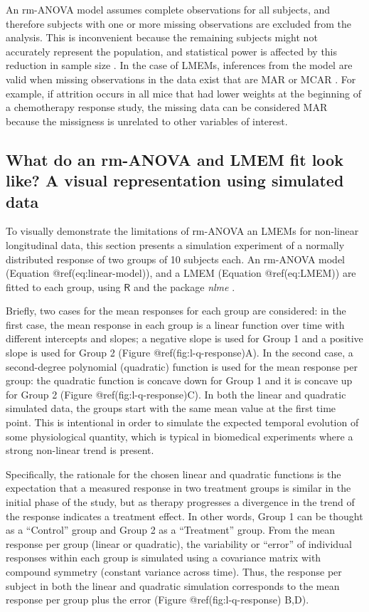 \documentclass[Royal,times,sagev]{sagej}
\begin{document}
An rm-ANOVA model assumes complete observations for all subjects, and
therefore subjects with one or more missing observations are excluded
from the analysis. This is inconvenient because the remaining subjects
might not accurately represent the population, and statistical power is
affected by this reduction in sample size \citep{ma2012}. In the case of
LMEMs, inferences from the model are valid when missing observations in
the data exist that are MAR or MCAR \citep{west2014}. For example, if
attrition occurs in all mice that had lower weights at the beginning of
a chemotherapy response study, the missing data can be considered MAR
because the missigness is unrelated to other variables of interest.

\hypertarget{simulation}{%
\subsection{What do an rm-ANOVA and LMEM fit look like? A visual
representation using simulated data}\label{simulation}}

To visually demonstrate the limitations of rm-ANOVA an LMEMs for
non-linear longitudinal data, this section presents a simulation
experiment of a normally distributed response of two groups of 10
subjects each. An rm-ANOVA model (Equation @ref(eq:linear-model)), and a
LMEM (Equation @ref(eq:LMEM)) are fitted to each group, using
\(\textsf{R}\) \citep{r} and the package \emph{nlme} \citep{nlme}.

Briefly, two cases for the mean responses for each group are considered:
in the first case, the mean response in each group is a linear function
over time with different intercepts and slopes; a negative slope is used
for Group 1 and a positive slope is used for Group 2 (Figure
@ref(fig:l-q-response)A). In the second case, a second-degree polynomial
(quadratic) function is used for the mean response per group: the
quadratic function is concave down for Group 1 and it is concave up for
Group 2 (Figure @ref(fig:l-q-response)C). In both the linear and
quadratic simulated data, the groups start with the same mean value at
the first time point. This is intentional in order to simulate the
expected temporal evolution of some physiological quantity, which is
typical in biomedical experiments where a strong non-linear trend is
present.

Specifically, the rationale for the chosen linear and quadratic
functions is the expectation that a measured response in two treatment
groups is similar in the initial phase of the study, but as therapy
progresses a divergence in the trend of the response indicates a
treatment effect. In other words, Group 1 can be thought as a
``Control'' group and Group 2 as a ``Treatment'' group. From the mean
response per group (linear or quadratic), the variability or ``error''
of individual responses within each group is simulated using a
covariance matrix with compound symmetry (constant variance across
time). Thus, the response per subject in both the linear and quadratic
simulation corresponds to the mean response per group plus the error
(Figure @ref(fig:l-q-response) B,D).
\end{document}
